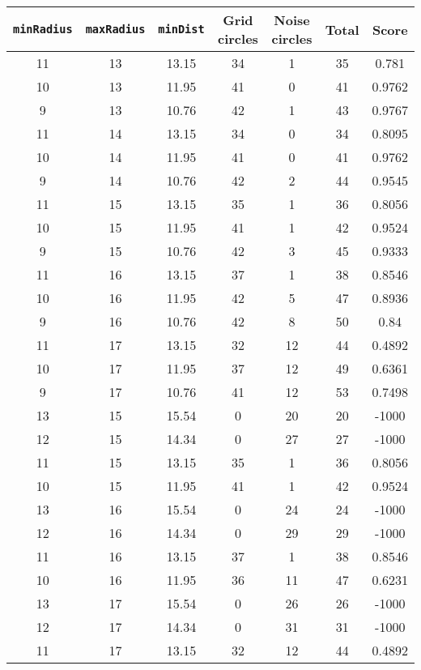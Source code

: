 \documentclass[letterpaper, 12pt]{article}
\begin{document}
\begin{longtable}{|c|c|c|c|c|c|c|}
\hline
\textbf{\texttt{minRadius}} & \textbf{\texttt{maxRadius}} & \textbf{\texttt{minDist}} & \textbf{Grid circles} & \textbf{Noise circles} & \textbf{Total} & \textbf{Score} \\
\hline
11 & 13 & 13.15 & 34 & 1 & 35 & 0.781 \\
\hline
10 & 13 & 11.95 & 41 & 0 & 41 & 0.9762 \\
\hline
9 & 13 & 10.76 & 42 & 1 & 43 & 0.9767 \\
\hline
11 & 14 & 13.15 & 34 & 0 & 34 & 0.8095 \\
\hline
10 & 14 & 11.95 & 41 & 0 & 41 & 0.9762 \\
\hline
9 & 14 & 10.76 & 42 & 2 & 44 & 0.9545 \\
\hline
11 & 15 & 13.15 & 35 & 1 & 36 & 0.8056 \\
\hline
10 & 15 & 11.95 & 41 & 1 & 42 & 0.9524 \\
\hline
9 & 15 & 10.76 & 42 & 3 & 45 & 0.9333 \\
\hline
11 & 16 & 13.15 & 37 & 1 & 38 & 0.8546 \\
\hline
10 & 16 & 11.95 & 42 & 5 & 47 & 0.8936 \\
\hline
9 & 16 & 10.76 & 42 & 8 & 50 & 0.84 \\
\hline
11 & 17 & 13.15 & 32 & 12 & 44 & 0.4892 \\
\hline
10 & 17 & 11.95 & 37 & 12 & 49 & 0.6361 \\
\hline
9 & 17 & 10.76 & 41 & 12 & 53 & 0.7498 \\
\hline
13 & 15 & 15.54 & 0 & 20 & 20 & -1000 \\
\hline
12 & 15 & 14.34 & 0 & 27 & 27 & -1000 \\
\hline
11 & 15 & 13.15 & 35 & 1 & 36 & 0.8056 \\
\hline
10 & 15 & 11.95 & 41 & 1 & 42 & 0.9524 \\
\hline
13 & 16 & 15.54 & 0 & 24 & 24 & -1000 \\
\hline
12 & 16 & 14.34 & 0 & 29 & 29 & -1000 \\
\hline
11 & 16 & 13.15 & 37 & 1 & 38 & 0.8546 \\
\hline
10 & 16 & 11.95 & 36 & 11 & 47 & 0.6231 \\
\hline
13 & 17 & 15.54 & 0 & 26 & 26 & -1000 \\
\hline
12 & 17 & 14.34 & 0 & 31 & 31 & -1000 \\
\hline
11 & 17 & 13.15 & 32 & 12 & 44 & 0.4892 \\
\hline

\end{longtable}
\end{document}
